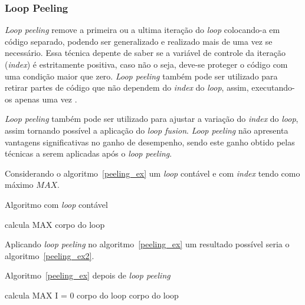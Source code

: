 \subsubsection{Loop Peeling}

\textit{Loop peeling} remove a primeira ou a ultima iteração do \textit{loop} 
colocando-a em código separado, podendo ser generalizado e realizado mais 
de uma vez se necessário. 
Essa técnica depente de saber se a variável de controle da iteração
(\textit{index}) é estritamente positiva, caso não o seja, deve-se proteger 
o código com uma condição maior que zero.
\textit{Loop peeling} também pode ser utilizado para retirar partes de código 
que não dependem do \textit{index} do \textit{loop}, assim, executando-os apenas
uma vez \cite{Song:2004}.

\textit{Loop peeling} também pode ser utilizado para ajustar a variação do 
\textit{index} do \textit{loop}, assim tornando possível a aplicação 
do \textit{loop fusion}.
\textit{Loop peeling} não apresenta vantagens significativas no ganho de
desempenho, sendo este ganho obtido pelas técnicas a serem aplicadas após
o \textit{loop peeling}.

Considerando o algoritmo~\ref{peeling_ex} um \textit{loop} contável e 
com \textit{index} tendo como máximo $MAX$.

\begin{algorithm}
\caption{Algoritmo com \textit{loop} contável}
\label{peeling_ex}
\begin{algorithmic}[1]

\STATE calcula MAX
\STATE corpo do loop
\ENDFOR

\end{algorithmic}
\end{algorithm}

Aplicando \textit{loop peeling} no algoritmo~\ref{peeling_ex} um resultado
possível seria o algoritmo~\ref{peeling_ex2}.

\begin{algorithm}
\caption{Algoritmo~\ref{peeling_ex} depois de \textit{loop peeling}}
\label{peeling_ex2}
\begin{algorithmic}[1]

\STATE calcula MAX
\STATE I = 0
\STATE corpo do loop
\STATE corpo do loop
\ENDFOR
\ENDIF

\end{algorithmic}
\end{algorithm}


